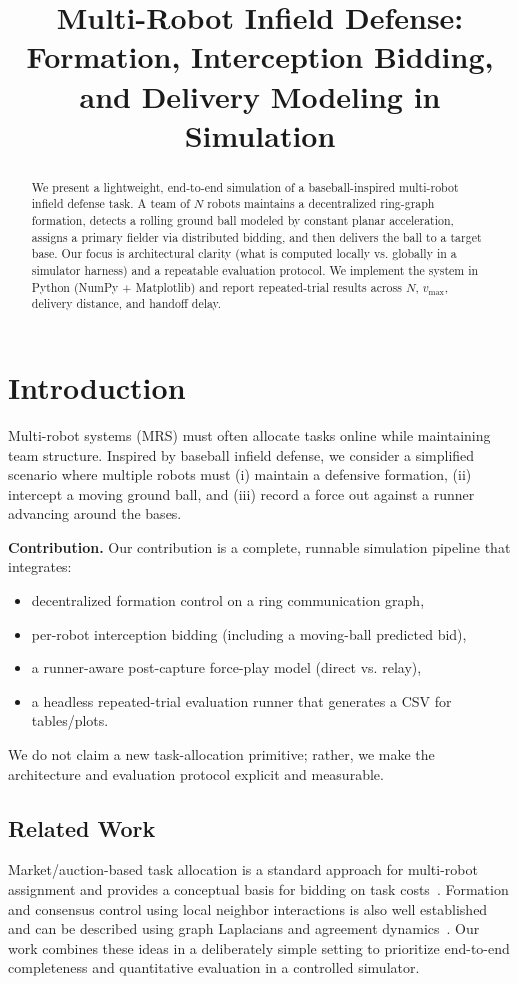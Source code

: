 \documentclass[conference]{IEEEtran}
\title{Multi-Robot Infield Defense: Formation, Interception Bidding, and Delivery Modeling in Simulation}
\author{
\IEEEauthorblockN{Aman Khatri, Dena Shink, Jason Ballinger}
\IEEEauthorblockA{Indiana University Bloomington}
}
\begin{document}
\maketitle

\begin{abstract}
We present a lightweight, end-to-end simulation of a baseball-inspired multi-robot infield defense task. A team of $N$ robots maintains a decentralized ring-graph formation, detects a rolling ground ball modeled by constant planar acceleration, assigns a primary fielder via distributed bidding, and then delivers the ball to a target base. Our focus is architectural clarity (what is computed locally vs. globally in a simulator harness) and a repeatable evaluation protocol. We implement the system in Python (NumPy + Matplotlib) and report repeated-trial results across $N$, $v_{\max}$, delivery distance, and handoff delay.
\end{abstract}

\section{Introduction}
Multi-robot systems (MRS) must often allocate tasks online while maintaining team structure. Inspired by baseball infield defense, we consider a simplified scenario where multiple robots must (i) maintain a defensive formation, (ii) intercept a moving ground ball, and (iii) record a force out against a runner advancing around the bases.

\textbf{Contribution.} Our contribution is a complete, runnable simulation pipeline that integrates:
\begin{itemize}
    \item decentralized formation control on a ring communication graph,
    \item per-robot interception bidding (including a moving-ball predicted bid),
    \item a runner-aware post-capture force-play model (direct vs. relay),
    \item a headless repeated-trial evaluation runner that generates a CSV for tables/plots.
\end{itemize}
We do not claim a new task-allocation primitive; rather, we make the architecture and evaluation protocol explicit and measurable.

\subsection{Related Work}
Market/auction-based task allocation is a standard approach for multi-robot assignment and provides a conceptual basis for bidding on task costs~\cite{gerkey2004}. Formation and consensus control using local neighbor interactions is also well established and can be described using graph Laplacians and agreement dynamics~\cite{mesbahi2010,olfati2006}. Our work combines these ideas in a deliberately simple setting to prioritize end-to-end completeness and quantitative evaluation in a controlled simulator.
\end{document}
